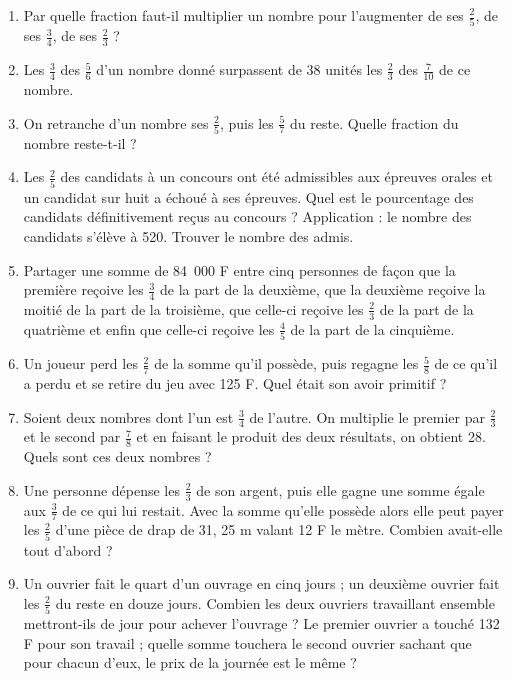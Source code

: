 \begin{enumerate}
  \item Par quelle fraction faut-il multiplier un nombre pour l'augmenter de ses $\frac25$, de ses $\frac34$, de ses $\frac23$ ? 
  \item Les $\frac34$ des $\frac56$ d'un nombre donné surpassent de 38 unités les $\frac23$ des $\frac7{10}$ de ce nombre. 
  \item On retranche d'un nombre ses $\frac25$,
  puis les $\frac57$ du reste. Quelle fraction du nombre reste-t-il ? 
  \item Les $\frac25$ des candidats à un concours ont été admissibles aux épreuves orales et un candidat sur huit a échoué à ses épreuves. Quel est le pourcentage 
  des candidats définitivement reçus au concours ? 
  Application : le nombre des candidats s'élève à 520. Trouver le nombre des admis.
  \item Partager une somme de 84~000 F entre cinq personnes de façon que la première reçoive les $\frac34$ de la part de la deuxième, 
  que la deuxième reçoive la moitié de la part de la troisième, 
  que celle-ci reçoive les $\frac23$ de la part de la quatrième et enfin que celle-ci reçoive les $\frac45$
  de la part de la cinquième. 
  \item Un joueur perd les $\frac27$ de la somme qu'il 
  possède, puis regagne les $\frac58$ de ce qu'il a perdu et se retire du jeu avec 125 F. Quel était son avoir primitif ? 
  \item Soient deux nombres dont l'un est $\frac34$ de 
  l'autre. On multiplie le premier par $\frac23$ et le second par $\frac78$ et en faisant le produit des deux résultats, on obtient 28. Quels sont ces deux nombres ? 
  \item Une personne dépense les $\frac23$ de son argent, puis elle gagne une somme égale aux $\frac37$
  de ce qui lui restait. Avec la somme qu'elle possède alors elle peut payer les $\frac25$ d'une pièce de drap de 31, 25 m valant 12 F le mètre. Combien avait-elle tout d'abord ? 
  \item Un ouvrier fait le quart d'un ouvrage en cinq jours ; un deuxième ouvrier fait les $\frac25$ du reste en douze jours. Combien les deux ouvriers travaillant ensemble mettront-ils de jour pour achever l'ouvrage ? Le premier ouvrier a touché 132 F pour son travail ; quelle somme touchera le second ouvrier sachant que pour chacun d'eux, le prix de la journée est le même ? 
 \end{enumerate}
